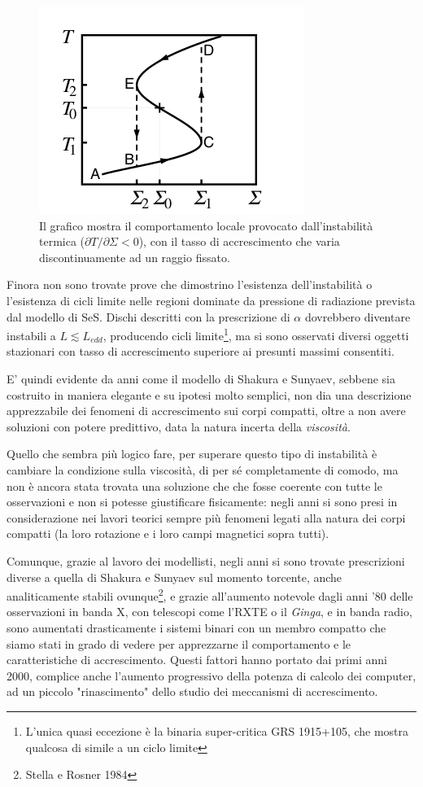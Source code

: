 \documentclass[a4paperbi]{article}
\begin{document}
	\begin{figure}[H]
		\centering
		\includegraphics[width=0.4\linewidth]{CicloLimite}
		\caption{Il grafico mostra il comportamento locale provocato dall'instabilità termica ($\partial T/\partial\Sigma<0$), con il tasso di accrescimento che varia discontinuamente ad un raggio fissato.}
		\label{fig:CicloLimite}
	\end{figure}
	
	Finora non sono trovate prove che dimostrino l'esistenza dell'instabilità o l'esistenza di cicli limite nelle regioni dominate da pressione di radiazione prevista dal modello di SeS. Dischi descritti con la prescrizione di $\alpha$ dovrebbero diventare instabili a $L\lesssim L_{edd}$, producendo cicli limite\footnote{L'unica quasi eccezione è la binaria super-critica GRS 1915+105, che mostra qualcosa di simile a un ciclo limite}, ma si sono osservati diversi oggetti stazionari con tasso di accrescimento superiore ai presunti massimi consentiti.
	
	E' quindi evidente da anni come il modello di Shakura e Sunyaev, sebbene sia costruito in maniera elegante e su ipotesi molto semplici, non dia una descrizione apprezzabile dei fenomeni di accrescimento sui corpi compatti, oltre a non avere soluzioni con potere predittivo, data la natura incerta della \textit{viscosità}.
	
	Quello che sembra più logico fare, per superare questo tipo di instabilità è cambiare la condizione sulla viscosità, di per sé completamente di comodo, ma non è ancora stata trovata una soluzione che che fosse coerente con tutte le osservazioni e non si potesse giustificare fisicamente: negli anni si sono presi in considerazione nei lavori teorici sempre più fenomeni legati alla natura dei corpi compatti (la loro rotazione e i loro campi magnetici sopra tutti).
	
	Comunque, grazie al lavoro dei modellisti, negli anni si sono trovate prescrizioni diverse a quella di Shakura e Sunyaev sul momento torcente, anche analiticamente stabili ovunque\footnote{Stella e Rosner 1984}, e grazie all'aumento notevole dagli anni '80 delle osservazioni in banda X, con telescopi come l'RXTE o il \textit{Ginga}, e in banda radio, sono aumentati drasticamente i sistemi binari con un membro compatto che siamo stati in grado di vedere per apprezzarne il comportamento e le caratteristiche di accrescimento. 
	Questi fattori hanno portato dai primi anni 2000, complice anche l'aumento progressivo della potenza di calcolo dei computer, ad un piccolo "rinascimento" dello studio dei meccanismi di accrescimento.
	
\end{document}
